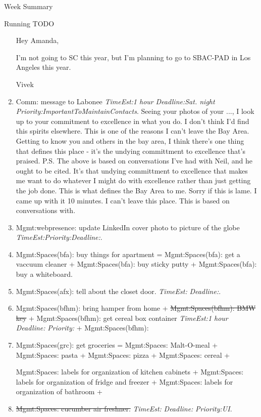 \documentclass[serif, mathserif, final]{beamer}
\newcommand{\doneTaskNoItem}[1]{\sout{#1}}
\newcommand{\doneTask}[1]{\tiny \item \tiny \sout{#1}}
\newcommand{\te}[1]{\textit{TimeEst:}\textit{#1}}
\newcommand{\dl}[1]{\textit{Deadline:}\textit{#1}}
\newcommand{\pr}[1]{\textit{Priority:}\textit{#1}}
\begin{document}
\begin{frame}
\begin{columns}
\begin{column}{0.5\linewidth}
\begin{block}{Week Summary}
\begin{block}{Running TODO}
\begin{enumerate}
        Hey Amanda, 
        
        I'm not going to SC this year, but I'm planning to go to SBAC-PAD in
        Los Angeles this year. 
        
        Vivek 
        
      \item \tiny Comm: message to Labonee \te{1 hour}
        \dl{Sat. night} \pr{ImportantToMaintainContacts}.
        Seeing your photos of your ..., I look up to your commitment to
        excellence in what you do. I don't think I'd find this
        spirits elsewhere. This is one of the reasons I can't leave
        the Bay Area. Getting to know you and others in the bay area, I think
        there's one thing that defines this place - it's the undying
        committment to excellence that's praised. 
        P.S. The above is based on conversations I've had with Neil,
        and he ought to be cited. It's that undying committment to
        excellence that makes me want to do whatever I might do with
        excellence rather than just getting the job done. This is
        what defines the Bay Area to me. Sorry if this is lame. I
        came up with it 10 minutes. I can't leave this place. This
        is based on conversations with. 

      \item \tiny Mgmt:webpresence: update LinkedIn cover photo to picture
        of the globe \te{}\pr{}\dl{}. 
        
      \item \tiny Mgmt:Spaces(bfa): buy things for apartment =
        Mgmt:Spaces(bfa): get a vaccuum cleaner + Mgmt:Spaces(bfa):
        buy sticky putty + Mgmt:Spaces(bfa): buy a whiteboard. 

      \item \tiny Mgmt:Spaces(afx): tell about the closet door. \te{} \dl{}.        
      \item \tiny Mgmt:Spaces(bfhm): bring hamper from home +
        \doneTaskNoItem{Mgmt:Spaces(bfhm): BMW key} +
        Mgmt:Spaces(bfhm): get cereal box container \te{1 hour} \dl{}
        \pr{} + Mgmt:Spaces(bfhm): 
 
      \item \tiny Mgmt:Spaces(grc): get groceries = Mgmt:Spaces:
        Malt-O-meal + Mgmt:Spaces: pasta + Mgmt:Spaces: pizza +
        Mgmt:Spaces: cereal + 

        Mgmt:Spaces: labels for organization of kitchen cabinets +
        Mgmt:Spaces: labels for organization of fridge and freezer +
        Mgmt:Spaces: labels for organization of bathroom +
        \doneTask{Mgmt:Spaces: cucumber air freshner.} \te{} \dl{}
        \pr{UI}. 
         

\end{enumerate}
\end{block}
\end{block}
\end{column}
\end{columns}
\end{frame}
\end{document}
